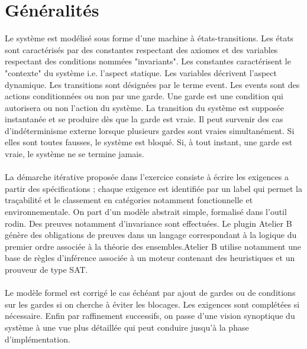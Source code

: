 
\section{Généralités}

Le système est modélisé sous forme d'une machine à états-transitions. Les états sont caractérisés par des constantes respectant des axiomes et des variables respectant des conditions nommées "invariants". Les constantes caractérisent le "contexte" du système i.e. l'aspect statique. Les variables décrivent l'aspect dynamique. Les transitions sont désignées par le terme event. Les events sont des actions conditionnées ou non par une garde. Une garde est une condition qui autorisera ou non l'action du système. La transition du système est supposée instantanée et se produire dès que la garde est vraie. Il peut survenir des cas d'indéterminisme externe lorsque plusieurs gardes sont vraies simultanément. Si elles sont toutes fausses, le système est bloqué. Si, à tout instant, une garde est vraie, le système ne se termine jamais.

\paragraph{}
La démarche itérative proposée dans l'exercice consiste à écrire les exigences a partir des spécifications ; chaque exigence est identifiée par un label qui permet la traçabilité et le classement en catégories notamment fonctionnelle et environnementale. On part d'un modèle abstrait simple, formalisé dans l'outil rodin. Des preuves notamment d'invariance sont effectuées. Le plugin Atelier B génère des obligations de preuves dans un langage correspondant à la logique du premier ordre associée à la théorie des ensembles.Atelier B utilise notamment une base de règles d’inférence associée à un moteur contenant des heuristiques et un prouveur de type SAT.

\paragraph{} Le modèle formel est corrigé le cas échéant par ajout de gardes ou de conditions sur les gardes si on cherche à éviter les blocages. Les exigences sont complétées si nécessaire. Enfin par raffinement successifs, on passe d'une vision synoptique du système à une vue plus détaillée qui peut conduire jusqu'à la phase d'implémentation.

